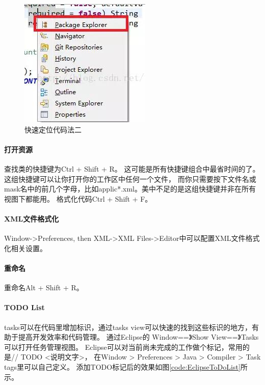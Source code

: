 \documentclass{book}
\begin{document}
\begin{figure}[htbp]
	\centering
	\includegraphics[scale=0.6]{LocateSourceCode.jpg}
	\caption{快速定位代码法二}
	\label{code:LocateSourceCode}
\end{figure}

\paragraph{打开资源}
查找类的快捷键为Ctrl + Shift + R。
这可能是所有快捷键组合中最省时间的了。这组快捷键可以让你打开你的工作区中任何一个文件，
而你只需要按下文件名或mask名中的前几个字母，比如applic*.xml。美中不足的是这组快捷键并非在所有视图下都能用。
格式化代码Ctrl + Shift + F。

\paragraph{XML文件格式化}

Window->Preferences, then XML->XML Files->Editor中可以配置XML文件格式化相关设置。

\paragraph{重命名}
重命名Alt + Shift + R。

\paragraph{TODO List}
tasks可以在代码里增加标识，通过tasks view可以快速的找到这些标识的地方，有助于提高开发效率和代码管理。
通过Eclipse的 Window==》Show View==》Tasks可以打开任务管理视图。
Eclipse可以对当前尚未完成的工作做个标记，常用的是// TODO <说明文字>，
在Window > Preferences > Java > Compiler > Task tags里可以自己定义。
添加TODO标记后的效果如图\ref{code:EclipseToDoList}所示。
\end{document}
